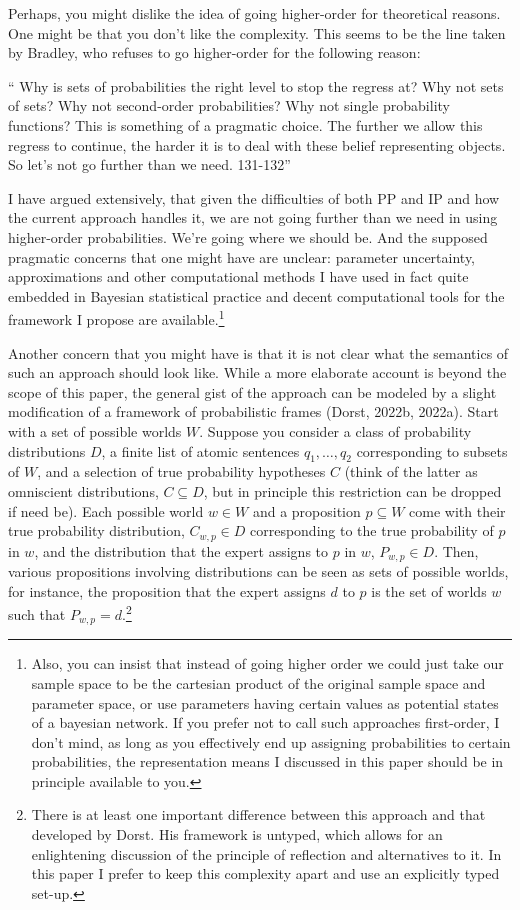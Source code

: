 \documentclass[
  10pt,
  dvipsnames,enabledeprecatedfontcommands]{scrartcl}
\renewenvironment{quote}
{\list{}{\leftmargin=1em\rightmargin=1em}\item[]``}
{''\endlist}
\begin{document}
Perhaps, you might dislike the idea of going higher-order for
theoretical reasons. One might be that you don't like the complexity.
This seems to be the line taken by Bradley, who refuses to go
higher-order for the following reason:

\begin{quote}
Why is sets of probabilities the right level to stop the regress at? Why not sets of sets? Why not second-order probabilities? Why not single probability functions? This is something of a pragmatic choice. The further we allow this regress to continue, the harder it is to deal with these belief representing objects. So let's not go further than we need. 131-132\end{quote}

I have argued extensively, that given the difficulties of both PP and IP
and how the current approach handles it, we are not going further than
we need in using higher-order probabilities. We're going where we should
be. And the supposed pragmatic concerns that one might have are unclear:
parameter uncertainty, approximations and other computational methods I
have used in fact quite embedded in Bayesian statistical practice and
decent computational tools for the framework I propose are
available.\footnote{Also, you can insist that instead of going higher order we could just take our sample space to be the cartesian product of the original sample space and parameter space, or use parameters having certain values as potential states of a bayesian network. If you prefer not to call such approaches first-order, I don't mind, as long as you effectively end up assigning probabilities to certain probabilities, the representation means I discussed in this paper should be in principle available to you.}

Another concern that you might have is that it is not clear what the
semantics of such an approach should look like. While a more elaborate
account is beyond the scope of this paper, the general gist of the
approach can be modeled by a slight modification of a framework of
probabilistic frames (Dorst, 2022b, 2022a). Start with a set of possible
worlds \(W\). Suppose you consider a class of probability distributions
\(D\), a finite list of atomic sentences \(q_1, \dots, q_2\)
corresponding to subsets of \(W\), and a selection of true probability
hypotheses \(C\) (think of the latter as omniscient distributions,
\(C\subseteq D\), but in principle this restriction can be dropped if
need be). Each possible world \(w\in W\) and a proposition
\(p\subseteq W\) come with their true probability distribution,
\(C_{w,p}\in D\) corresponding to the true probability of \(p\) in
\(w\), and the distribution that the expert assigns to \(p\) in \(w\),
\(P_{w,p}\in D\). Then, various propositions involving distributions can
be seen as sets of possible worlds, for instance, the proposition that
the expert assigns \(d\) to \(p\) is the set of worlds \(w\) such that
\(P_{w,p}=d\).\footnote{There is at least one important difference between this approach and that developed by Dorst. His  framework is untyped, which allows for an enlightening discussion of the principle of reflection and alternatives to it. In this paper I prefer to keep this complexity apart and use an explicitly typed set-up.}
\end{document}
